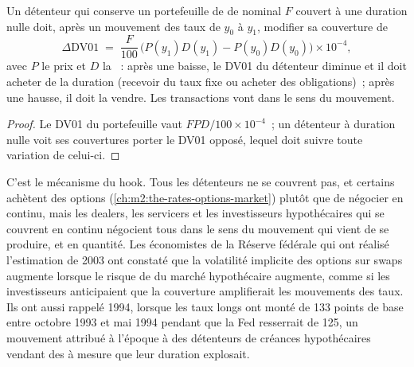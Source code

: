 \begin{proposition}\label{prop:m2:mortgages-and-agencies:hedge}
Un détenteur qui conserve un portefeuille de  de nominal $F$ couvert à une duration nulle
doit, après un mouvement des taux de $y_0$ à $y_1$, modifier sa couverture de
\[
\Delta\mathrm{DV01} \;=\; \frac{F}{100}\,\bigl(P(y_1) D(y_1) - P(y_0) D(y_0)\bigr)\times 10^{-4},
\]
avec $P$ le prix et $D$ la ~: après une baisse, le DV01 du
détenteur diminue et il doit acheter de la duration (recevoir du taux fixe ou acheter des obligations)~; après une
hausse, il doit la vendre. Les transactions vont dans le sens du mouvement.
\end{proposition}

\begin{proof}
Le DV01 du portefeuille vaut $F P D/100 \times 10^{-4}$~; un détenteur à duration nulle
voit ses couvertures porter le DV01 opposé, lequel doit suivre toute variation de celui-ci.
\end{proof}

C'est le mécanisme du hook. Tous les détenteurs ne se couvrent pas, et certains achètent des
options (\cref{ch:m2:the-rates-options-market}) plutôt que de négocier en continu,
mais les dealers, les servicers et les investisseurs hypothécaires qui se couvrent en continu
négocient tous dans le sens du mouvement qui vient de se produire, et en quantité. Les économistes
de la Réserve fédérale qui ont réalisé l'estimation de 2003 ont constaté que la volatilité implicite
des options sur swaps augmente lorsque le risque de  du marché hypothécaire augmente, comme si
les investisseurs anticipaient que la couverture amplifierait les mouvements des taux. Ils ont aussi rappelé 1994,
lorsque les taux longs ont monté de 133 points de base entre octobre 1993 et mai 1994 pendant que
la Fed resserrait de 125, un mouvement attribué à l'époque à des détenteurs de créances
hypothécaires vendant des  à mesure que leur duration explosait.

